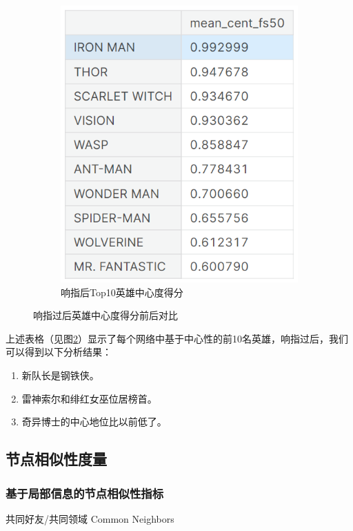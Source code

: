 \documentclass[12pt]{xjtureport}
\begin{document}
\begin{figure}[htbp]
\begin{subfigure}[b]{0.35\textwidth}
        \includegraphics[width=\textwidth]{figures/响指后top10.png}
        \caption{响指后Top10英雄中心度得分}
        \label{fig:sub23}
    \end{subfigure}
    \caption{响指过后英雄中心度得分前后对比}
    \label{fig:combined3}
  \end{figure}

上述表格（见图\ref{fig:combined3}）显示了每个网络中基于中心性的前10名英雄，响指过后，我们可以得到以下分析结果：
\begin{enumerate}
    \item 新队长是钢铁侠。
    \item 雷神索尔和绯红女巫位居榜首。
    \item 奇异博士的中心地位比以前低了。
\end{enumerate}

\subsection{节点相似性度量}
\subsubsection{基于局部信息的节点相似性指标}
共同好友/共同领域 Common Neighbors
\end{document}
